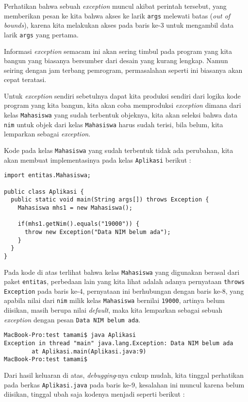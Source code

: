 Perhatikan bahwa sebuah \textit{exception} muncul akibat perintah tersebut, yang memberikan pesan ke kita bahwa akses ke larik \texttt{args} melewati batas (\textit{out of bounds}), karena kita melakukan akses pada baris ke-3 untuk mengambil data larik \texttt{args} yang pertama.

Informasi \textit{exception} semacam ini akan sering timbul pada program yang kita bangun yang biasanya bersumber dari desain yang kurang lengkap. Namun seiring dengan jam terbang pemrogram, permasalahan seperti ini biasanya akan cepat teratasi.

Untuk \textit{exception} sendiri sebetulnya dapat kita produksi sendiri dari logika kode program yang kita bangun, kita akan coba memproduksi \textit{exception} dimana dari kelas \texttt{Mahasiswa} yang sudah terbentuk objeknya, kita akan seleksi bahwa data \texttt{nim} untuk objek dari kelas \texttt{Mahasiswa} harus sudah terisi, bila belum, kita lemparkan sebagai \textit{exception}. 

Kode pada kelas \texttt{Mahasiswa} yang sudah terbentuk tidak ada perubahan, kita akan membuat implementasinya pada kelas \texttt{Aplikasi} berikut :

\begin{lstlisting}
import entitas.Mahasiswa;

public class Aplikasi {
  public static void main(String args[]) throws Exception {
    Mahasiswa mhs1 = new Mahasiswa();

    if(mhs1.getNim().equals("19000")) {
      throw new Exception("Data NIM belum ada");
    }
  }
}
\end{lstlisting}

Pada kode di atas terlihat bahwa kelas \texttt{Mahasiswa} yang digunakan berasal dari paket \texttt{entitas}, perbedaan lain yang kita lihat adalah adanya pernyataan \texttt{throws Exception} pada baris ke-4, pernyataan ini berhubungan dengan baris ke-8, yang apabila nilai dari \texttt{nim} milik kelas \texttt{Mahasiswa} bernilai \texttt{19000}, artinya belum diisikan, masih berupa nilai \textit{default}, maka kita lemparkan sebagai sebuah \textit{exception} dengan pesan \texttt{Data NIM belum ada}.

\begin{lstlisting}
MacBook-Pro:test tamami$ java Aplikasi
Exception in thread "main" java.lang.Exception: Data NIM belum ada
        at Aplikasi.main(Aplikasi.java:9)
MacBook-Pro:test tamami$
\end{lstlisting}

Dari hasil keluaran di atas, \textit{debugging}-nya cukup mudah, kita tinggal perhatikan pada berkas \texttt{Aplikasi.java} pada baris ke-9, kesalahan ini muncul karena belum diisikan, tinggal ubah saja kodenya menjadi seperti berikut :

